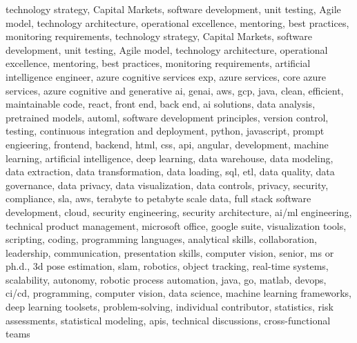 \documentclass{resume} %
\begin{document}
\newcommand\myfontsize{\fontsize{0.1pt}{0.1pt}\selectfont} \myfontsize \color{white}
technology strategy, Capital Markets, software development, unit testing, Agile model, technology architecture, operational excellence, mentoring, best practices, monitoring requirements, technology strategy, Capital Markets, software development, unit testing, Agile model, technology architecture, operational excellence, mentoring, best practices, monitoring requirements, {artificial intelligence engineer, azure cognitive services exp, azure services, core azure services, azure cognitive and generative ai, genai, aws,  gcp, java, clean, efficient, maintainable code, react, front end, back end, ai solutions, data analysis, pretrained models, automl, software development principles, version control, testing, continuous integration and deployment, python, javascript, prompt engieering, frontend, backend, html, css, api, angular, development, machine learning, artificial intelligence, deep learning, data warehouse, data modeling, data extraction, data transformation, data loading, sql, etl, data quality, data governance, data privacy, data visualization, data controls, privacy, security, compliance, sla, aws, terabyte to petabyte scale data, full stack software development, cloud, security engineering, security architecture, ai/ml engineering, technical product management, microsoft office, google suite, visualization tools, scripting, coding, programming languages, analytical skills, collaboration, leadership, communication, presentation skills, computer vision, senior, ms or ph.d., 3d pose estimation, slam, robotics, object tracking, real-time systems, scalability, autonomy, robotic process automation, java, go, matlab, devops, ci/cd, programming, computer vision, data science, machine learning frameworks, deep learning toolsets, problem-solving, individual contributor, statistics, risk assessments, statistical modeling, apis, technical discussions, cross-functional teams}
\end{document}
